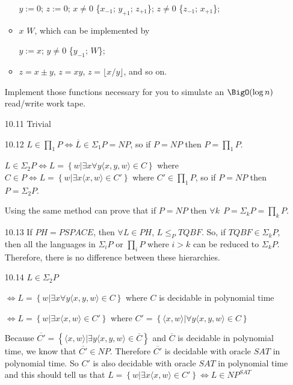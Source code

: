 \begin{itemize}
\begin{itemize}
		$y := 0$; $z := 0$;  $x \neq 0$  \{$x_{-1}$; $y_{+1}$; $z_{+1}$\};  $z \neq 0$  \{$z_{-1}$; $x_{+1}$\}; 
		
		\item {} $x$  $W$, which can be implemented by
		
		$y := x$;  $y \neq 0$  \{$y_{-1}$; $W$\};
		
		\item $z = x \pm y$, $z = xy$, $z = \lfloor x/y \rfloor$, and so on.
	\end{itemize}
	Implement those functions necessary for you to simulate an $\BigO(\log n)$ read/write work tape.
	
	\item[10.11]
	Trivial
	
	\item[10.12]
	$ L \in \prod_1 P \Longleftrightarrow \overline{L} \in \Sigma_1 P = NP $, so if $ P=NP $ then $ P=\prod_1 P $.
	
	$ L \in \Sigma_2 P \Longleftrightarrow L = \left\{ w | \exists x \forall y \langle x,y,w \rangle \in C \right\} $ where $ C \in P \Longleftrightarrow L = \left\{ w | \exists x \langle x,w \rangle \in C' \right\} $ where $ C' \in \prod_1 P $, so if $ P=NP $ then $ P=\Sigma_2 P $.
	
	Using the same method can prove that if $ P=NP $ then $ \forall k~~ P=\Sigma_k P=\prod_k P $.
	
	\item[10.13]
	If $ PH=PSPACE $, then $ \forall L \in PH $, $ L \le_P TQBF $. So, if $ TQBF \in \Sigma_k P $, then all the languages in $ \Sigma_i P $ or $ \prod_i P $ where $ i>k $ can be reduced to $ \Sigma_k P $. Therefore, there is no difference between these hierarchies.
	
	\item[10.14]
	$ L \in \Sigma_2 P $
	
	$ \Longleftrightarrow L = \left\{ w | \exists x \forall y \langle x,y,w \rangle \in C \right\} $ where $ C $ is decidable in polynomial time
	
	$ \Longleftrightarrow L = \left\{ w | \exists x \langle x,w \rangle \in C' \right\} $ where $ C' = \left\{ \langle x,w \rangle | \forall y \langle x,y,w \rangle \in C \right\} $
	
	Because $ \overline{C'} = \left\{ \langle x,w \rangle | \exists y \langle x,y,w \rangle \in \overline{C} \right\} $ and $ \overline{C} $ is decidable in polynomial time, we know that $ \overline{C'} \in NP $. Therefore $ \overline{C'} $ is decidable with oracle $ SAT $ in polynomial time. So $ C' $ is also decidable with oracle $ SAT $ in polynomial time and this should tell us that $ L = \left\{ w | \exists x \langle x,w \rangle \in C' \right\} \Longleftrightarrow L \in NP^{SAT} $
	

\end{itemize}
